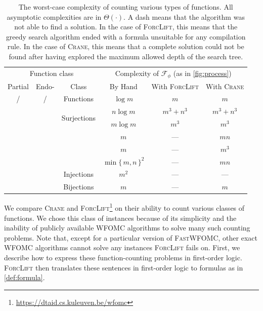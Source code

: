 \documentclass{article}
\newcommand{\cmark}{\ding{51}}%
\newcommand{\xmark}{\ding{55}}%
\begin{document}
\begin{table}[t]
  \centering
  \begin{tabular}{cccccc}
    \toprule
    \multicolumn{3}{c}{Function class} & \multicolumn{3}{c}{Complexity of $\mathcal{F}_{\phi}$ (as in \cref{fig:process})} \\
    Partial & Endo- & Class & By Hand & With \textsc{ForcLift} & With \textsc{Crane} \\
    \midrule
    \rowcolor{gray!25}\cmark/\xmark & \cmark/\xmark & Functions & $\log m$ & $m$ & $m$ \\
    \xmark & \xmark & \multirow{2}{*}{Surjections} & $n \log m$ & $m^{3}+n^{3}$ & $m^{3}+n^{3}$ \\
    \xmark & \cmark & & $m \log m$ & $m^{3}$ & $m^{3}$ \\
    \rowcolor{gray!25}\xmark & \xmark & & $m$ & --- & $mn$ \\
    \rowcolor{gray!25}\xmark & \cmark & & $m$ & --- & $m^3$ \\
    \rowcolor{gray!25}\cmark & \xmark & & ${\min\{\, m, n \,\}}^2$ & --- & $mn$ \\
    \rowcolor{gray!25}\cmark & \cmark & \multirow{-4}{*}{Injections} & $m^2$ & --- & --- \\
    \xmark & \xmark & Bijections & $m$ & --- & $m$ \\
    \bottomrule
  \end{tabular}
  \caption{The worst-case complexity of counting various types of functions. All
    asymptotic complexities are in $\Theta(\cdot)$. A dash means that the
    algorithm was not able to find a solution. In the case of \textsc{ForcLift},
    this means that the greedy search algorithm ended with a formula unsuitable
    for any compilation rule. In the case of \textsc{Crane}, this means that a
    complete solution could not be found after having explored the maximum
    allowed depth of the search tree.}\label{tbl:results}
\end{table}

We compare \textsc{Crane} and
\textsc{ForcLift}\footnote{\url{https://dtaid.cs.kuleuven.be/wfomc}} on their
ability to count various classes of functions. We chose this class of instances
because of its simplicity and the inability of publicly available WFOMC
algorithms to solve many such counting problems. Note that, except for a
particular version of \textsc{FastWFOMC}, other exact WFOMC algorithms cannot
solve any instances \textsc{ForcLift} fails on. First, we describe how to
express these function-counting problems in first-order logic. \textsc{ForcLift}
then translates these sentences in first-order logic to formulas as in
\cref{def:formula}.
\end{document}
